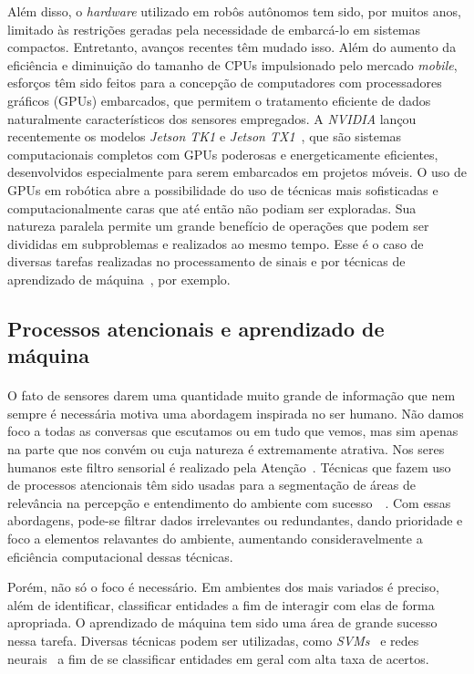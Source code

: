 \documentclass[11pt]{article}
\newcommand{\tit}[1]{\textit{#1}}
\begin{document}
Além disso, o \tit{hardware} utilizado em robôs autônomos tem sido, por muitos 
anos, limitado às restrições geradas pela necessidade de embarcá-lo em sistemas 
compactos. 
Entretanto, avanços recentes têm mudado isso. 
Além do aumento da eficiência e diminuição do tamanho de CPUs impulsionado pelo 
mercado \tit{mobile}, esforços têm sido feitos para a concepção de computadores 
com processadores gráficos (GPUs) embarcados, que permitem o tratamento 
eficiente de dados naturalmente característicos dos sensores empregados.  
A \tit{NVIDIA} lançou recentemente os modelos 
\tit{Jetson TK1} e \tit{Jetson TX1}~\cite{jetson}, que são sistemas 
computacionais completos com GPUs poderosas e energeticamente eficientes, 
desenvolvidos especialmente para serem embarcados em projetos móveis.
O uso de GPUs em robótica abre a possibilidade do uso de técnicas mais 
sofisticadas e computacionalmente caras que até então não podiam ser exploradas.
Sua natureza paralela permite um grande benefício de operações que podem ser
divididas em subproblemas e realizados ao mesmo tempo. 
Esse é o caso de diversas tarefas realizadas no processamento de sinais e por 
técnicas de aprendizado de máquina~\cite{gpu}, por exemplo. 

\subsection{Processos atencionais e aprendizado de máquina}
\paragraph{}
O fato de sensores darem uma quantidade muito grande de informação que nem 
sempre é necessária motiva uma abordagem inspirada no ser humano.
Não damos foco a todas as conversas que escutamos ou em tudo que vemos, mas sim 
apenas na parte que nos convém ou cuja natureza é extremamente atrativa. 
Nos seres humanos este filtro sensorial é realizado pela 
Atenção~\cite{Dux_Marois_2009}. 
Técnicas que fazem uso de processos atencionais têm sido usadas para a 
segmentação de áreas de relevância na percepção e entendimento do 
ambiente com sucesso~\cite{bio}~\cite{esther}.
Com essas abordagens, pode-se filtrar dados irrelevantes ou
redundantes, dando prioridade e foco a elementos relavantes do ambiente, 
aumentando consideravelmente a eficiência computacional dessas técnicas. 

Porém, não só o foco é necessário. Em ambientes dos mais variados é preciso, 
além de identificar, classificar entidades a fim de interagir com elas de forma
apropriada. 
O aprendizado de máquina tem sido uma área de grande sucesso nessa tarefa.
Diversas técnicas podem ser utilizadas, como \tit{SVMs}~\cite{svm} 
e redes neurais~\cite{nn} a fim de se classificar entidades em geral com 
alta taxa de acertos. 
\end{document}
